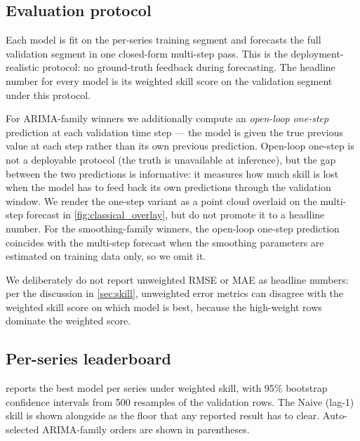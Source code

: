 \subsection{Evaluation protocol}
\label{sec:classical:protocol}

Each model is fit on the per-series training segment and forecasts the full validation segment in one closed-form multi-step pass. This is the deployment-realistic protocol: no ground-truth feedback during forecasting. The headline number for every model is its weighted skill score on the validation segment under this protocol.

For ARIMA-family winners we additionally compute an \emph{open-loop one-step} prediction at each validation time step --- the model is given the true previous value at each step rather than its own previous prediction. Open-loop one-step is not a deployable protocol (the truth is unavailable at inference), but the gap between the two predictions is informative: it measures how much skill is lost when the model has to feed back its own predictions through the validation window. We render the one-step variant as a point cloud overlaid on the multi-step forecast in \cref{fig:classical_overlay}, but do not promote it to a headline number. For the smoothing-family winners, the open-loop one-step prediction coincides with the multi-step forecast when the smoothing parameters are estimated on training data only, so we omit it.

We deliberately do not report unweighted RMSE or MAE as headline numbers: per the discussion in \cref{sec:skill}, unweighted error metrics can disagree with the weighted skill score on which model is best, because the high-weight rows dominate the weighted score.

\subsection{Per-series leaderboard}
\label{sec:classical:leaderboard}

 reports the best model per series under weighted skill, with 95\% bootstrap confidence intervals from 500 resamples of the validation rows. The Naive (lag-1) skill is shown alongside as the floor that any reported result has to clear. Auto-selected ARIMA-family orders are shown in parentheses.

